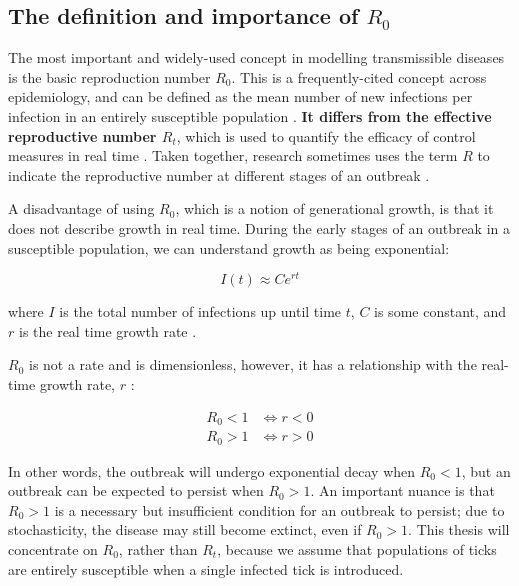 \documentclass{article}
\begin{document}
\subsection{The definition and importance of \texorpdfstring{$ R_0 $}{R0}}

The most important and widely-used concept in modelling transmissible diseases is the basic reproduction number $ R_0 $. This is a frequently-cited concept across epidemiology, and can be defined as the mean number of new infections per infection in an entirely susceptible population \cite{Diekman2000}. \textbf{It differs from the effective reproductive number $ R_t $}, which is used to quantify the efficacy of control measures in real time \cite{Lim2020}. Taken together, research sometimes uses the term $ R $ to indicate the reproductive number at different stages of an outbreak \cite{Jewell2022}.

A disadvantage of using $ R_0 $, which is a notion of generational growth, is that it does not describe growth in real time. During the early stages of an outbreak in a susceptible population, we can understand growth as being exponential:

\begin{equation}
	I(t) \approx Ce^{rt}
\end{equation}

where $ I $ is the total number of infections up until time $ t $, $ C $ is some constant, and $ r $ is the real time growth rate \cite{Diekman2000}.

$ R_0 $ is not a rate and is dimensionless, however, it has a relationship with the real-time growth rate, $ r $ \cite{Diekman2000}:

\begin{align}\label{R0}
  R_0 < 1 &\iff r < 0 \nonumber \\
  R_0 > 1 &\iff r > 0
\end{align}

In other words, the outbreak will undergo exponential decay when $ R_0 < 1 $, but an outbreak can be expected to persist when $ R_0 > 1 $. An important nuance is that $ R_0 > 1 $ is a necessary but insufficient condition for an outbreak to persist; due to stochasticity, the disease may still become extinct, even if $ R_0 > 1 $. This thesis will concentrate on $ R_0 $, rather than $ R_t $, because we assume that populations of ticks are entirely susceptible when a single infected tick is introduced.
\end{document}
